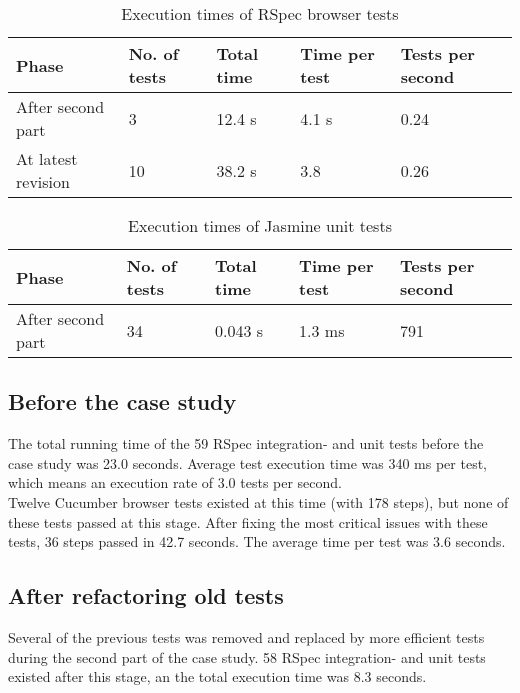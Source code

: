 \begin{table}[t]
    \centering
    \begin{tabular}{l l l l l}
        Phase & No. of tests & Total time & Time per test & Tests per second \\
        \hline
        After second part & 3 &  12.4 s & 4.1 s & 0.24\\
        At latest revision & 10 & 38.2 s & 3.8 & 0.26\\
    \end{tabular}
    \caption{ Execution times of RSpec browser tests }
    \label{tab:rspec_browser_times}
\end{table}

\begin{table}[t]
    \centering
    \begin{tabular}{l l l l l}
        Phase & No. of tests & Total time & Time per test & Tests per second \\
        \hline
        After second part & 34 &  0.043 s & 1.3 ms & 791\\
    \end{tabular}
    \caption{ Execution times of Jasmine unit tests }
    \label{tab:jasmine_times}
\end{table}


\subsection{Before the case study}

The total running time of the 59 RSpec integration- and unit tests
before the case study was 23.0 seconds. Average test execution time was
340 ms per test, which means an execution rate of 3.0 tests per
second.\\

Twelve Cucumber browser tests existed at this time (with 178 steps), but
none of these tests passed at this stage. After fixing the most critical
issues with these tests, 36 steps passed in 42.7 seconds. The average
time per test was 3.6 seconds.\\


\subsection{After refactoring old tests}

Several of the previous tests was removed and replaced by more efficient
tests during the second part of the case study. 58 RSpec integration-
and unit tests existed after this stage, an the total execution time was
8.3 seconds.\\

